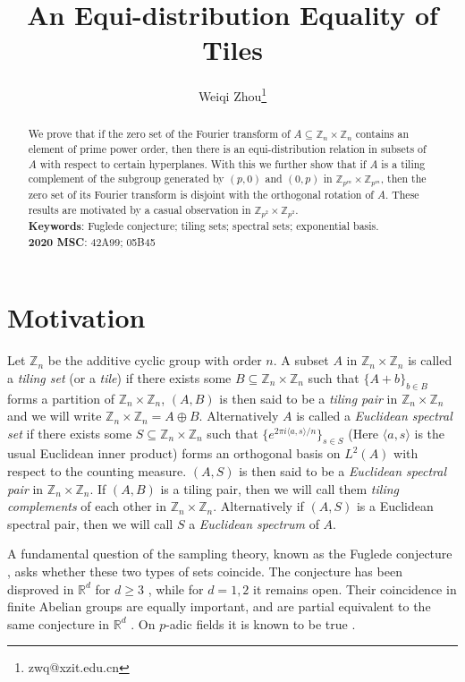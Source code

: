 \documentclass[A4, 11pt]{article}
\title{An Equi-distribution Equality of Tiles}
\author{Weiqi Zhou\thanks{zwq@xzit.edu.cn}}
\affil{\small School of Mathematics and Statistics, Xuzhou University of Technology \\  {\footnotesize Lishui Road 2, Yunlong District, Xuzhou, Jiangsu Province, China 221111}}
\date{}
\newcommand{\bra}[1]{\langle#1\rangle}
\newcommand{\G}[1]{\mathbb Z_{#1}\times\mathbb Z_{#1}}
\begin{document}
\maketitle
\begin{abstract}
We prove that if the zero set of the Fourier transform of $A\subseteq\G{n}$ contains an element of prime power order, then there is an equi-distribution relation in subsets of $A$ with respect to certain hyperplanes. With this we further show that if $A$ is a tiling complement of the subgroup generated by $(p,0)$ and $(0,p)$ in $\G{p^m}$, then the zero set of its Fourier transform is disjoint with the orthogonal rotation of $A$. These results are motivated by a casual observation in $\G{p^2}$. \\

{\noindent
{\bf Keywords}:  Fuglede conjecture; tiling sets; spectral sets; exponential basis. \\[1ex]
{\bf 2020 MSC}: 42A99; 05B45}
\end{abstract}
 
\section{Motivation}
Let $\mathbb Z_n$ be the additive cyclic group with order $n$. A subset $A$ in $\G{n}$ is called a \emph{tiling set} (or a \emph{tile}) if there exists some $B\subseteq\G{n}$ such that $\{A+b\}_{b\in B}$ forms a partition of $\G{n}$, $(A,B)$ is then said to be a \emph{tiling pair} in $\G{n}$ and we will write $\G{n}=A\oplus B$. Alternatively $A$ is called a \emph{Euclidean spectral set} if there exists some $S\subseteq\G{n}$ such that $\{e^{2\pi i\bra{a,s}/n}\}_{s\in S}$ (Here $\bra{a,s}$ is the usual Euclidean inner product) forms an orthogonal basis on $L^2(A)$ with respect to the counting measure. $(A,S)$ is then said to be a \emph{Euclidean spectral pair} in $\G{n}$. If $(A,B)$ is a tiling pair, then we will call them \emph{tiling complements} of each other in $\G{n}$. Alternatively if $(A,S)$ is a Euclidean spectral pair, then we will call $S$ a \emph{Euclidean spectrum} of $A$.

A fundamental question of the sampling theory, known as the Fuglede conjecture \cite{fuglede1974}, asks whether these two types of sets coincide. The conjecture has been disproved in $\mathbb R^d$ for $d\ge 3$ \cite{farkas2006, matolcsi2006, kolounzakis2006, matolcsi2005, tao2004}, while for $d=1,2$ it remains open. Their coincidence in finite Abelian groups are equally important, and are partial equivalent to the same conjecture in $\mathbb R^d$  \cite{dutkay2014, iosevich2013, wang1996}. On $p$-adic fields it is known to be true \cite{fan2016, fan2019}. 
\end{document}
